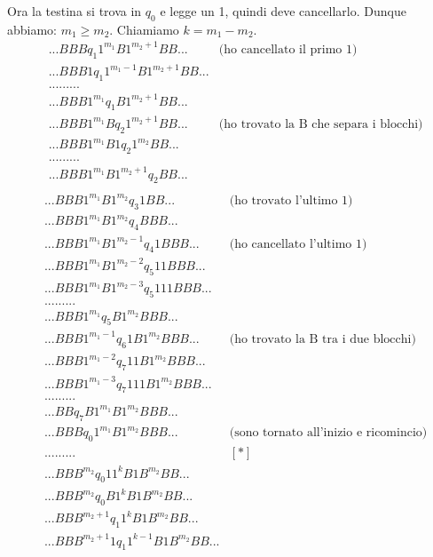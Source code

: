 \begin{esempio}[Sottrazione]
Ora la testina si trova in $q_{0}$ e legge un 1, quindi deve cancellarlo. Dunque abbiamo:
$m_{1}\geq m_{2}$. Chiamiamo $k=m_{1} - m_{2}$.\\
\begin{eqnarray*}
&...BBBq_{1}1^{m_{1}}B1^{m_{2}+1}BB...&\mbox{(ho cancellato il primo 1)}\\
&...BBB1q_{1}1^{m_{1}-1}B1^{m_{2}+1}BB...&\\
&.........&\\
&...BBB1^{m_{1}}q_{1}B1^{m_{2}+1}BB...&\\
&...BBB1^{m_{1}}Bq_{2}1^{m_{2}+1}BB...&\mbox{(ho trovato la B che separa i blocchi)}\\
&...BBB1^{m_{1}}B1q_{2}1^{m_{2}}BB...&\\
&.........&\\
&...BBB1^{m_{1}}B1^{m_{2}+1}q_{2}BB...&\\
\end{eqnarray*}
\begin{eqnarray*}
&...BBB1^{m_{1}}B1^{m_{2}}q_{3}1BB...&\mbox{(ho trovato l'ultimo 1)}\\
&...BBB1^{m_{1}}B1^{m_{2}}q_{4}BBB...&\\
&...BBB1^{m_{1}}B1^{m_{2}-1}q_{4}1BBB...&\mbox{(ho cancellato l'ultimo 1)}\\
&...BBB1^{m_{1}}B1^{m_{2}-2}q_{5}11BBB...&\\
&...BBB1^{m_{1}}B1^{m_{2}-3}q_{5}111BBB...&\\
&.........&\\
&...BBB1^{m_{1}}q_{5}B1^{m_{2}}BBB...&\\
&...BBB1^{m_{1}-1}q_{6}1B1^{m_{2}}BBB...&\mbox{(ho trovato la B tra i due blocchi)}\\
&...BBB1^{m_{1}-2}q_{7}11B1^{m_{2}}BBB...&\\
&...BBB1^{m_{1}-3}q_{7}111B1^{m_{2}}BBB...&\\
&.........&\\
&...BBq_{7}B1^{m_{1}}B1^{m_{2}}BBB...&\\
&...BBBq_{0}1^{m_{1}}B1^{m_{2}}BBB...&\mbox{(sono tornato all'inizio e ricomincio)}\\
&.........\qquad\qquad\qquad&[*]\\
&...BBB^{m_{2}}q_{0}11^{k}B1B^{m_{2}}BB...&\\
&...BBB^{m_{2}}q_{0}B1^{k}B1B^{m_{2}}BB...&\\
&...BBB^{m_{2}+1}q_{1}1^{k}B1B^{m_{2}}BB...&\\
&...BBB^{m_{2}+1}1q_{1}1^{k-1}B1B^{m_{2}}BB...&\\

\end{eqnarray*}
\end{esempio}
